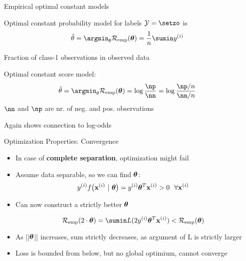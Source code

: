 \documentclass[11pt,compress,t,notes=noshow, xcolor=table]{beamer}
\begin{document}
\begin{framei}[sep=L]{Empirical optimal constant models}

\item Optimal constant probability model for labels $\Yspace = \setzo$ is 
$$\thetah = \argmin_{\theta} \risket = \frac{1}{n} \sumin \yi$$
\item Fraction of class-1 observations in observed data
\item Optimal constant score model:
$$\thetah = \argmin_{\theta} \risket = \log \frac{\np}{\nn} = \log \frac{\np / n}{\nn /n}$$ 
$\nn$ and $\np$ are nr.  of neg. and pos. observations
\item Again shows connection to log-odds 


\end{framei}


\begin{frame2}[footnotesize]{Optimization Properties: Convergence}


\begin{itemize}

\item In case of \textbf{complete separation}, optimization might 
fail

{
}

\item Assume data separable, so we can find $\bm{\theta}$:
$$ y^{(i)} f\big(\mathbf{x}^{(i)} ~|~ \bm{\theta}\big) = y^{(i)} \bm{\theta}^T \mathbf{x}^{(i)} > 0 ~~ \forall \mathbf{x}^{(i)}$$

\item Can now construct a strictly better $\bm{\theta}$

$$    
\riske(2 \cdot \thetav) = \sumin L ( 2 \yi \thetav^T \xi) < \risket
$$

\item As ||$\bm{\theta}$|| increases, sum strictly decreases, as argument of L is strictly larger

\item Loss is bounded from below, but no global optimium, cannot converge
\end{itemize}

\end{frame2}
\end{document}
